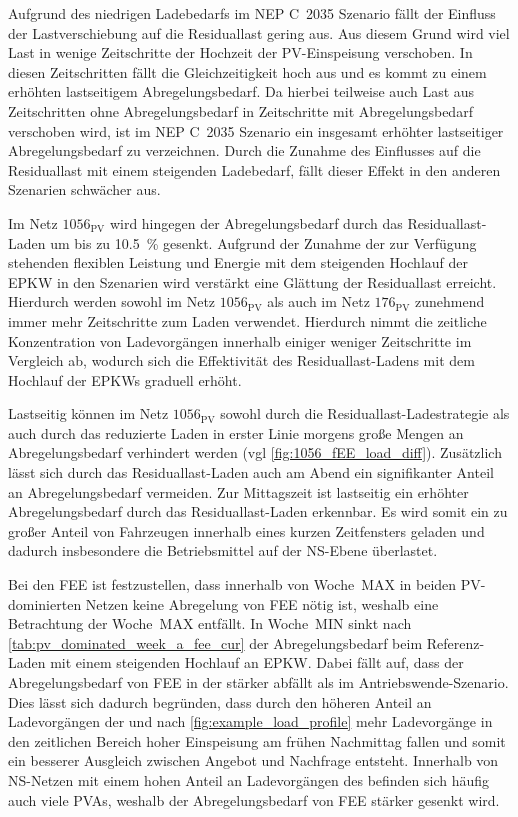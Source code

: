 Aufgrund des niedrigen Ladebedarfs im \gls{NEP} C~\num{2035} Szenario fällt der Einfluss der Lastverschiebung auf die Residuallast gering aus.
Aus diesem Grund wird viel Last in wenige Zeitschritte der Hochzeit der \gls{PV}-Einspeisung verschoben.
In diesen Zeitschritten fällt die Gleichzeitigkeit hoch aus und es kommt zu einem erhöhten lastseitigem Abregelungsbedarf.
Da hierbei teilweise auch Last aus Zeitschritten ohne Abregelungsbedarf in Zeitschritte mit Abregelungsbedarf verschoben wird, ist im \gls{NEP} C~\num{2035} Szenario ein insgesamt erhöhter lastseitiger Abregelungsbedarf zu verzeichnen.
Durch die Zunahme des Einflusses auf die Residuallast mit einem steigenden Ladebedarf, fällt dieser Effekt in den anderen Szenarien schwächer aus.



Im Netz \(1056_{\text{PV}}\) wird hingegen der Abregelungsbedarf durch das Residuallast-Laden um bis zu \SI{10.5}{\percent} gesenkt.
Aufgrund der Zunahme der zur Verfügung stehenden flexiblen Leistung und Energie mit dem steigenden Hochlauf der \gls{EPKW} in den Szenarien wird verstärkt eine Glättung der Residuallast erreicht.
Hierdurch werden sowohl im Netz \(1056_{\text{PV}}\) als auch im Netz \(176_{\text{PV}}\) zunehmend immer mehr Zeitschritte zum Laden verwendet.
Hierdurch nimmt die zeitliche Konzentration von Ladevorgängen innerhalb einiger weniger Zeitschritte im Vergleich ab, wodurch sich die Effektivität des Residuallast-Ladens mit dem Hochlauf der \glspl{EPKW} graduell erhöht.

Lastseitig können im Netz \(1056_{\text{PV}}\) sowohl durch die Residuallast-Ladestrategie als auch durch das reduzierte Laden in erster Linie morgens große Mengen an Abregelungsbedarf verhindert werden (vgl \autoref{fig:1056_fEE_load_diff}).
Zusätzlich lässt sich durch das Residuallast-Laden auch am Abend ein signifikanter Anteil an Abregelungsbedarf vermeiden.
Zur Mittagszeit ist lastseitig ein erhöhter Abregelungsbedarf durch das Residuallast-Laden erkennbar.
Es wird somit ein zu großer Anteil von Fahrzeugen innerhalb eines kurzen Zeitfensters geladen und dadurch insbesondere die Betriebsmittel auf der \gls{NS}-Ebene überlastet.\medskip

Bei den \gls{FEE} ist festzustellen, dass innerhalb von Woche~MAX in beiden \gls{PV}-dominierten Netzen keine Abregelung von \gls{FEE} nötig ist, weshalb eine Betrachtung der Woche~MAX entfällt.
In Woche~MIN sinkt nach \autoref{tab:pv_dominated_week_a_fee_cur} der Abregelungsbedarf beim Referenz-Laden mit einem steigenden Hochlauf an \gls{EPKW}.
Dabei fällt auf, dass der Abregelungsbedarf von \gls{FEE} in der \SzeFirmenparkplatz stärker abfällt als im Antriebswende-Szenario.
Dies lässt sich dadurch begründen, dass durch den höheren Anteil an Ladevorgängen der \UCs \oeffen und \zH nach \autoref{fig:example_load_profile} mehr Ladevorgänge in den zeitlichen Bereich hoher Einspeisung am frühen Nachmittag fallen und somit ein besserer Ausgleich zwischen Angebot und Nachfrage entsteht.
Innerhalb von \gls{NS}-Netzen mit einem hohen Anteil an Ladevorgängen des \UC \zH befinden sich häufig auch viele \glspl{PVA}, weshalb der Abregelungsbedarf von \gls{FEE} stärker gesenkt wird.

